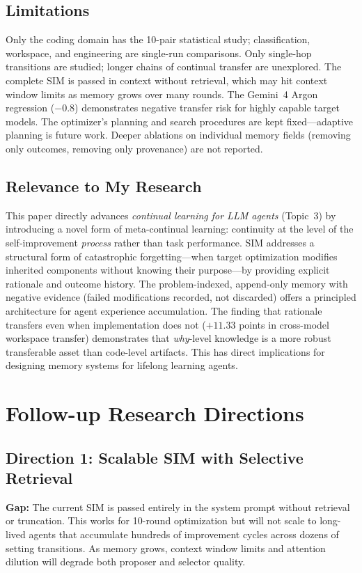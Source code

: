\documentclass[11pt,a4paper]{article}
\begin{document}
\subsection{Limitations}
Only the coding domain has the 10-pair statistical study; classification, workspace, and engineering are single-run comparisons. Only single-hop transitions are studied; longer chains of continual transfer are unexplored. The complete SIM is passed in context without retrieval, which may hit context window limits as memory grows over many rounds. The Gemini~4 Argon regression ($-0.8$) demonstrates negative transfer risk for highly capable target models. The optimizer's planning and search procedures are kept fixed---adaptive planning is future work. Deeper ablations on individual memory fields (removing only outcomes, removing only provenance) are not reported.

\subsection{Relevance to My Research}
This paper directly advances \emph{continual learning for LLM agents} (Topic~3) by introducing a novel form of meta-continual learning: continuity at the level of the self-improvement \emph{process} rather than task performance. SIM addresses a structural form of catastrophic forgetting---when target optimization modifies inherited components without knowing their purpose---by providing explicit rationale and outcome history. The problem-indexed, append-only memory with negative evidence (failed modifications recorded, not discarded) offers a principled architecture for agent experience accumulation. The finding that rationale transfers even when implementation does not ($+11.33$ points in cross-model workspace transfer) demonstrates that \emph{why}-level knowledge is a more robust transferable asset than code-level artifacts. This has direct implications for designing memory systems for lifelong learning agents.

\section{Follow-up Research Directions}

\subsection{Direction 1: Scalable SIM with Selective Retrieval}
\textbf{Gap:} The current SIM is passed entirely in the system prompt without retrieval or truncation. This works for 10-round optimization but will not scale to long-lived agents that accumulate hundreds of improvement cycles across dozens of setting transitions. As memory grows, context window limits and attention dilution will degrade both proposer and selector quality.
\end{document}
